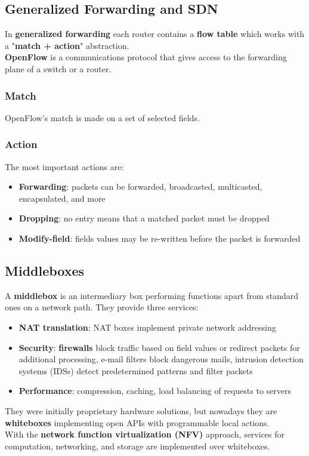 \documentclass{article}
\begin{document}
\subsection{Generalized Forwarding and SDN}
In \textbf{generalized forwarding} each router contains a \textbf{flow table} which works with a "\textbf{match + action}" abstraction. \\ \textbf{OpenFlow} is a communications protocol that gives access to the forwarding plane of a switch or a router. 
\subsubsection{Match}
OpenFlow's match is made on a set of selected fields.
\subsubsection{Action}
The most important actions are:
\begin{itemize}
    \item \textbf{Forwarding}: packets can be forwarded, broadcasted, multicasted, encapsulated, and more
    \item \textbf{Dropping}: no entry means that a matched packet must be dropped
    \item \textbf{Modify-field}: fields values may be re-written before the packet is forwarded
\end{itemize}

\subsection{Middleboxes}
A \textbf{middlebox} is an intermediary box performing functions apart from standard ones on a network path. They provide three services:
\begin{itemize}
    \item \textbf{NAT translation}: NAT boxes implement private network addressing
    \item \textbf{Security}: \textbf{firewalls} block traffic based on field values or redirect packets for additional processing, e-mail filters block dangerous mails, intrusion detection systems (IDSs) detect predetermined patterns and filter packets
    \item \textbf{Performance}: compression, caching, load balancing of requests to servers
\end{itemize}
They were initially proprietary hardware solutions, but nowadays they are \textbf{whiteboxes} implementing open APIs with programmable local actions. \\ With the \textbf{network function virtualization (NFV)} approach, services for computation, networking, and storage are implemented over whiteboxes. 
\end{document}
